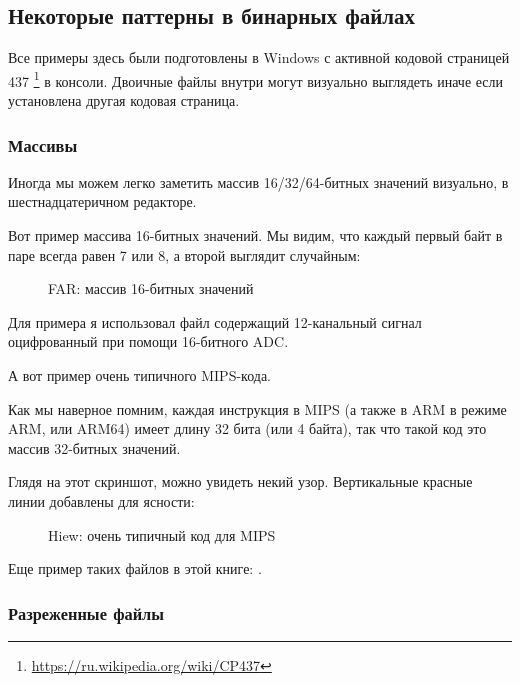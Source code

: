 
\subsection{Некоторые паттерны в бинарных файлах}

Все примеры здесь были подготовлены в Windows с активной кодовой страницей 437
\footnote{\url{https://ru.wikipedia.org/wiki/CP437}} в консоли.
Двоичные файлы внутри могут визуально выглядеть иначе если установлена другая кодовая страница.

\clearpage
\subsubsection{Массивы}

Иногда мы можем легко заметить массив 16/32/64-битных значений визуально, в шестнадцатеричном 
редакторе.

Вот пример массива 16-битных значений.
Мы видим, что каждый первый байт в паре всегда равен 7 или 8, а второй выглядит случайным:

\begin{figure}[H]
\centering
{}
\caption{FAR: массив 16-битных значений}
\end{figure}

Для примера я использовал файл содержащий 12-канальный сигнал оцифрованный при помощи 16-битного \ac{ADC}.

\clearpage
{}
\par А вот пример очень типичного MIPS-кода.

Как мы наверное помним, каждая инструкция в MIPS (а также в ARM в режиме ARM, или ARM64) имеет 
длину 32 бита (или 4 байта),
так что такой код это массив 32-битных значений.

Глядя на этот скриншот, можно увидеть некий узор.
Вертикальные красные линии добавлены для ясности:

\begin{figure}[H]
\centering
{}
\caption{Hiew: очень типичный код для MIPS}
\end{figure}

Еще пример таких файлов в этой книге: 
.

\clearpage
\subsubsection{Разреженные файлы}


